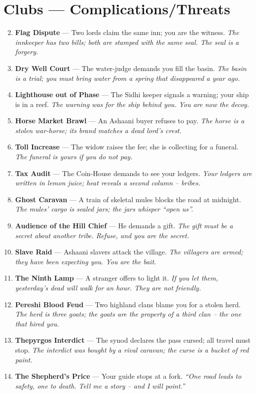 \documentclass[11pt]{book}
\begin{document}
\section*{Clubs — Complications/Threats}
\begin{enumerate}
\setcounter{enumi}{1}
\item \textbf{Flag Dispute} — Two lords claim the same inn; you are the witness. \textit{The innkeeper has two bills; both are stamped with the same seal. The seal is a forgery.}
\item \textbf{Dry Well Court} — The water‑judge demands you fill the basin. \textit{The basin is a trial; you must bring water from a spring that disappeared a year ago.}
\item \textbf{Lighthouse out of Phase} — The Sidhi keeper signals a warning; your ship is in a reef. \textit{The warning was for the ship behind you. You are now the decoy.}
\item \textbf{Horse Market Brawl} — An Ashaani buyer refuses to pay. \textit{The horse is a stolen war‑horse; its brand matches a dead lord’s crest.}
\item \textbf{Toll Increase} — The widow raises the fee; she is collecting for a funeral. \textit{The funeral is yours if you do not pay.}
\item \textbf{Tax Audit} — The Coin‑House demands to see your ledgers. \textit{Your ledgers are written in lemon juice; heat reveals a second column – bribes.}
\item \textbf{Ghost Caravan} — A train of skeletal mules blocks the road at midnight. \textit{The mules’ cargo is sealed jars; the jars whisper “open us”.}
\item \textbf{Audience of the Hill Chief} — He demands a gift. \textit{The gift must be a secret about another tribe. Refuse, and you are the secret.}
\item \textbf{Slave Raid} — Ashaani slavers attack the village. \textit{The villagers are armed; they have been expecting you. You are the bait.}
\item[J] \textbf{The Ninth Lamp} — A stranger offers to light it. \textit{If you let them, yesterday’s dead will walk for an hour. They are not friendly.}
\item[Q] \textbf{Pereshi Blood Feud} — Two highland clans blame you for a stolen herd. \textit{The herd is three goats; the goats are the property of a third clan – the one that hired you.}
\item[K] \textbf{Thepyrgos Interdict} — The synod declares the pass cursed; all travel must stop. \textit{The interdict was bought by a rival caravan; the curse is a bucket of red paint.}
\item[A] \textbf{The Shepherd’s Price} — Your guide stops at a fork. \textit{“One road leads to safety, one to death. Tell me a story – and I will point.”}
\end{enumerate}
\end{document}
